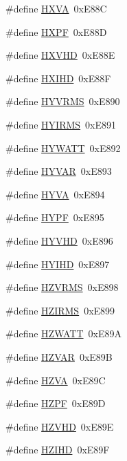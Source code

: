 \begin{DoxyCompactItemize}
\item 
\#define \hyperlink{a00036_acfd250a61a5d7421cdbc541f94ce5ae4}{H\-X\-V\-A}~0x\-E88\-C
\item 
\#define \hyperlink{a00036_a3059705ef55e2b519c1872600621b9f8}{H\-X\-P\-F}~0x\-E88\-D
\item 
\#define \hyperlink{a00036_a7019352fa8966727d6306b8a2bf81829}{H\-X\-V\-H\-D}~0x\-E88\-E
\item 
\#define \hyperlink{a00036_ac22e2f229bd4f7de9a5c26f6fc824b92}{H\-X\-I\-H\-D}~0x\-E88\-F
\item 
\#define \hyperlink{a00036_afbd4e3b51312feb540b5675a44d6abf5}{H\-Y\-V\-R\-M\-S}~0x\-E890
\item 
\#define \hyperlink{a00036_a106c8c6a9eecb98d5120f148a5996b3b}{H\-Y\-I\-R\-M\-S}~0x\-E891
\item 
\#define \hyperlink{a00036_a34edc40ea8bcbfdb7d03fd94f225d184}{H\-Y\-W\-A\-T\-T}~0x\-E892
\item 
\#define \hyperlink{a00036_a847595b2ffa3361f8ae0d4613fbf7e37}{H\-Y\-V\-A\-R}~0x\-E893
\item 
\#define \hyperlink{a00036_a8a225ce68dcc59466a3b22d1b788f311}{H\-Y\-V\-A}~0x\-E894
\item 
\#define \hyperlink{a00036_a568414006677cee317dbecd162a95858}{H\-Y\-P\-F}~0x\-E895
\item 
\#define \hyperlink{a00036_a2f6ec1439fe130170ec30efb36850100}{H\-Y\-V\-H\-D}~0x\-E896
\item 
\#define \hyperlink{a00036_ab72d02266f5b5d71c904dad3a46d11f2}{H\-Y\-I\-H\-D}~0x\-E897
\item 
\#define \hyperlink{a00036_a128b260b91bf7bf1970f9e26c4866958}{H\-Z\-V\-R\-M\-S}~0x\-E898
\item 
\#define \hyperlink{a00036_a422744a9f0c3a47ad3818902a10a4f73}{H\-Z\-I\-R\-M\-S}~0x\-E899
\item 
\#define \hyperlink{a00036_a62b2bcc794747ca4c5755a58a2b48a60}{H\-Z\-W\-A\-T\-T}~0x\-E89\-A
\item 
\#define \hyperlink{a00036_acc4d6765ba1ad97bd9055403813255f0}{H\-Z\-V\-A\-R}~0x\-E89\-B
\item 
\#define \hyperlink{a00036_aa7c156f6b0fe00c1c83008c3469a006b}{H\-Z\-V\-A}~0x\-E89\-C
\item 
\#define \hyperlink{a00036_a79d893d611b3b5c28395f81a070844b5}{H\-Z\-P\-F}~0x\-E89\-D
\item 
\#define \hyperlink{a00036_a040a97dd095f5e8991d153c16e4ed4ff}{H\-Z\-V\-H\-D}~0x\-E89\-E
\item 
\#define \hyperlink{a00036_a56de93637570af225bf16eeb5dc75b53}{H\-Z\-I\-H\-D}~0x\-E89\-F

\end{DoxyCompactItemize}
